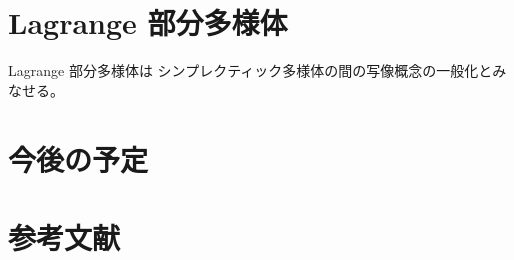 \documentclass[report]{jlreq}
\begin{document}
\begin{definition}
    \TODO{}
\end{definition}

\begin{definition}[Hamiltonian]
    \TODO{}
\end{definition}

%
\section{Lagrange 部分多様体}

\begin{definition}
    \TODO{}
\end{definition}

Lagrange 部分多様体は
シンプレクティック多様体の間の写像概念の一般化とみなせる。

\begin{definition}[Lagrange 対応]
    \TODO{}
\end{definition}

%
\section*{今後の予定}

%
\section*{参考文献}

%
\end{document}
